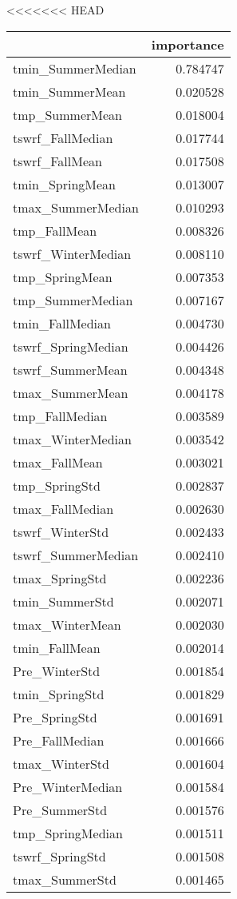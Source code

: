 <<<<<<< HEAD
\begin{tabular}{lr}
\toprule
 & importance \\
\midrule
tmin_SummerMedian & 0.784747 \\
tmin_SummerMean & 0.020528 \\
tmp_SummerMean & 0.018004 \\
tswrf_FallMedian & 0.017744 \\
tswrf_FallMean & 0.017508 \\
tmin_SpringMean & 0.013007 \\
tmax_SummerMedian & 0.010293 \\
tmp_FallMean & 0.008326 \\
tswrf_WinterMedian & 0.008110 \\
tmp_SpringMean & 0.007353 \\
tmp_SummerMedian & 0.007167 \\
tmin_FallMedian & 0.004730 \\
tswrf_SpringMedian & 0.004426 \\
tswrf_SummerMean & 0.004348 \\
tmax_SummerMean & 0.004178 \\
tmp_FallMedian & 0.003589 \\
tmax_WinterMedian & 0.003542 \\
tmax_FallMean & 0.003021 \\
tmp_SpringStd & 0.002837 \\
tmax_FallMedian & 0.002630 \\
tswrf_WinterStd & 0.002433 \\
tswrf_SummerMedian & 0.002410 \\
tmax_SpringStd & 0.002236 \\
tmin_SummerStd & 0.002071 \\
tmax_WinterMean & 0.002030 \\
tmin_FallMean & 0.002014 \\
Pre_WinterStd & 0.001854 \\
tmin_SpringStd & 0.001829 \\
Pre_SpringStd & 0.001691 \\
Pre_FallMedian & 0.001666 \\
tmax_WinterStd & 0.001604 \\
Pre_WinterMedian & 0.001584 \\
Pre_SummerStd & 0.001576 \\
tmp_SpringMedian & 0.001511 \\
tswrf_SpringStd & 0.001508 \\
tmax_SummerStd & 0.001465 \\

\end{tabular}
